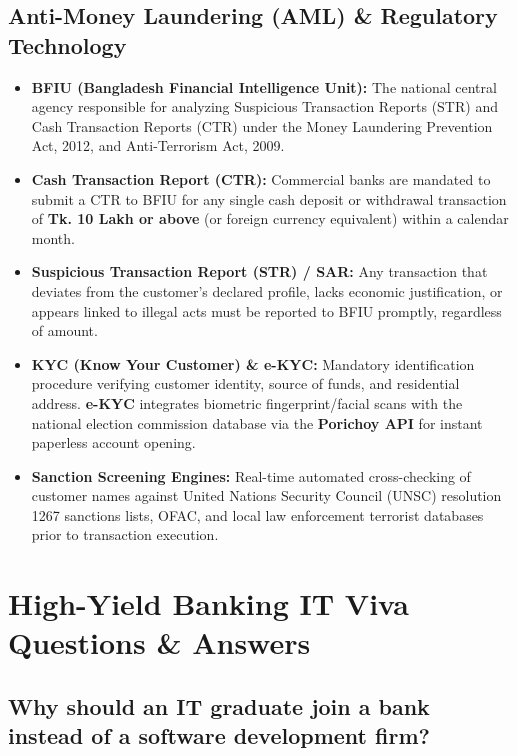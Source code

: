 \medskip

\subsection{Anti-Money Laundering (AML) \& Regulatory Technology}

\begin{itemize}
  \item \textbf{BFIU (Bangladesh Financial Intelligence Unit):} The national central agency responsible for analyzing Suspicious Transaction Reports (STR) and Cash Transaction Reports (CTR) under the Money Laundering Prevention Act, 2012, and Anti-Terrorism Act, 2009.
  \item \textbf{Cash Transaction Report (CTR):} Commercial banks are mandated to submit a CTR to BFIU for any single cash deposit or withdrawal transaction of \textbf{Tk. 10 Lakh or above} (or foreign currency equivalent) within a calendar month.
  \item \textbf{Suspicious Transaction Report (STR) / SAR:} Any transaction that deviates from the customer's declared profile, lacks economic justification, or appears linked to illegal acts must be reported to BFIU promptly, regardless of amount.
  \item \textbf{KYC (Know Your Customer) \& e-KYC:} Mandatory identification procedure verifying customer identity, source of funds, and residential address. \textbf{e-KYC} integrates biometric fingerprint/facial scans with the national election commission database via the \textbf{Porichoy API} for instant paperless account opening.
  \item \textbf{Sanction Screening Engines:} Real-time automated cross-checking of customer names against United Nations Security Council (UNSC) resolution 1267 sanctions lists, OFAC, and local law enforcement terrorist databases prior to transaction execution.
\end{itemize}

\medskip

\section{High-Yield Banking IT Viva Questions \& Answers}

\subsection{Why should an IT graduate join a bank instead of a software development firm?}

